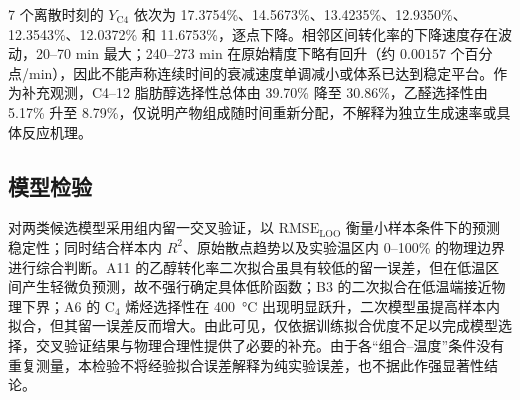 7 个离散时刻的 $Y_{\mathrm{C4}}$ 依次为 17.3754\%、14.5673\%、13.4235\%、12.9350\%、12.3543\%、12.0372\% 和 11.6753\%，逐点下降。相邻区间转化率的下降速度存在波动，20--70 min 最大；240--273 min 在原始精度下略有回升（约 $0.00157$ 个百分点/min），因此不能声称连续时间的衰减速度单调减小或体系已达到稳定平台。作为补充观测，C4--12 脂肪醇选择性总体由 39.70\% 降至 30.86\%，乙醛选择性由 5.17\% 升至 8.79\%，仅说明产物组成随时间重新分配，不解释为独立生成速率或具体反应机理。

\subsection{模型检验}

对两类候选模型采用组内留一交叉验证，以 $\mathrm{RMSE}_{\mathrm{LOO}}$ 衡量小样本条件下的预测稳定性；同时结合样本内 $R^2$、原始散点趋势以及实验温区内 0--100\% 的物理边界进行综合判断。A11 的乙醇转化率二次拟合虽具有较低的留一误差，但在低温区间产生轻微负预测，故不强行确定具体低阶函数；B3 的二次拟合在低温端接近物理下界；A6 的 $\mathrm{C}_4$ 烯烃选择性在 \SI{400}{\degreeCelsius} 出现明显跃升，二次模型虽提高样本内拟合，但其留一误差反而增大。由此可见，仅依据训练拟合优度不足以完成模型选择，交叉验证结果与物理合理性提供了必要的补充。由于各“组合--温度”条件没有重复测量，本检验不将经验拟合误差解释为纯实验误差，也不据此作强显著性结论。
